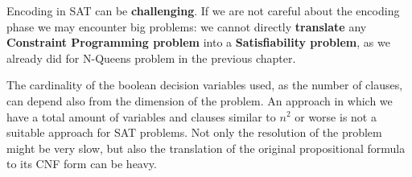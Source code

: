 Encoding in SAT can be \textbf{challenging}. If we are not careful about the encoding phase we may encounter big problems: we cannot directly \textbf{translate}
any \textbf{Constraint Programming problem} into a \textbf{Satisfiability problem}, as we already did for N-Queens problem in the previous chapter. \vspace{7pt}

The cardinality of the boolean decision variables used, as the number of clauses, can depend also from the dimension of the problem. An approach in which we have 
a total amount of variables and clauses similar to $n^2$ or worse is not a suitable approach for SAT problems. Not only the resolution of the problem 
might be very slow, but also the translation of the original propositional formula to its CNF form can be heavy.
